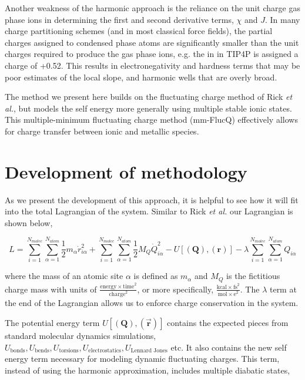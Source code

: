 Another weakness of the harmonic approach is the reliance on the unit charge
gas phase ions in determining the first and second derivative terms, $\chi$ and
$J$.  In many charge partitioning schemes (and in most classical force fields),
the partial charges assigned to condensed phase atoms are significantly smaller
than the unit charges required to produce the gas phase ions, e.g. the 
in  in TIP4P is assigned a charge of +0.52.\citep{Jorgensen:1983tp}
This results in electronegativity and hardness terms that may be poor estimates
of the local slope, and harmonic wells that are overly broad.

The method we present here builds on the fluctuating charge method of Rick {\it
et al.}\citep{Rick:1994ss}, but models the self energy more generally using
multiple stable ionic states.  This multiple-minimum fluctuating charge method
(mm-FlucQ) effectively allows for charge transfer between ionic and metallic
species.

\section{Development of methodology}

As we present the development of this approach, it is helpful to see how it
will fit into the total Lagrangian of the system. Similar to Rick {\it et
al.}\citep{Rick:1994ss} our Lagrangian is shown below,

\begin{equation}
L = \sum^{N_{molec}}_{i=1}\sum^{N_{atom}}_{\alpha = 1} \frac{1}{2}m_{\alpha} \dot{r}^2_{i\alpha} + \sum^{N_{molec}}_{i=1}\sum^{N_{atom}}_{\alpha = 1} \frac{1}{2}M_Q\dot{Q}^2_{i\alpha} - U[(\mathbf{Q}),(\mathbf{r})] - \lambda \sum^{N_{molec}}_{i=1}\sum^{N_{atom}}_{\alpha = 1} Q_{i\alpha}
\end{equation}

where the mass of an atomic site $\alpha$ is defined as $m_\alpha$ and $M_Q$ is
the fictitious charge mass with units of $\frac{\mathrm{energy\times
time}^2}{\mathrm{charge}^2}$, or more specifically, $\frac{\mathrm{kcal\times
fs}^2}{\mathrm{mol\times e}^2}$. The $\lambda$ term at the end of the
Lagrangian allows us to enforce charge conservation in the system.

The potential energy term $U[(\mathbf{Q}),(\vec{\mathbf{r}})]$ contains the
expected pieces from standard molecular dynamics simulations,
$U_{\text{bonds}}, U_{\text{bends}}, U_{\text{torsions}},
U_{\text{electrostatics}}, U_{\text{Lennard Jones}}$ etc. It also contains the
new self energy term necessary for modeling dynamic fluctuating charges. This
term, instead of using the harmonic approximation, includes multiple diabatic
states,

